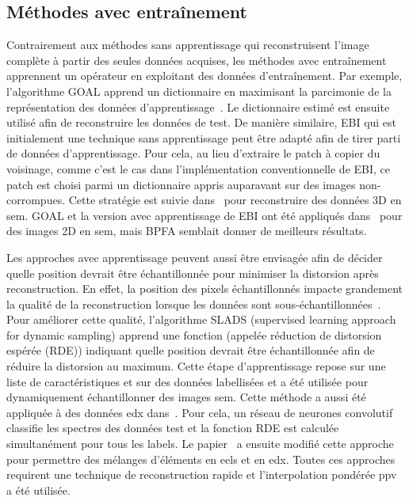 \subsection{Méthodes avec entraînement}

Contrairement aux méthodes sans apprentissage qui reconstruisent l'image complète à partir des seules données acquises, les méthodes avec entraînement apprennent un opérateur en exploitant des données d'entraînement. Par exemple, l'algorithme GOAL apprend un dictionnaire en maximisant la parcimonie de la représentation des données d'apprentissage~\cite{hawe2013analysis}. Le dictionnaire estimé est ensuite utilisé afin de reconstruire les données de test. De manière similaire, EBI qui est initialement une technique sans apprentissage peut être adapté afin de tirer parti de données d'apprentissage. Pour cela, au lieu d'extraire le patch à copier du voisinage, comme c'est le cas dans l'implémentation conventionnelle de EBI, ce patch est choisi parmi un dictionnaire appris auparavant sur des images non-corrompues. Cette stratégie est suivie dans~\cite{trampert2018exemplar} pour reconstruire des données 3D en \gls{sem}. GOAL et la version avec apprentissage de EBI ont été appliqués dans~\cite{trampert2018ultramicroscopy} pour des images 2D en \gls{sem}, mais BPFA semblait donner de meilleurs résultats.

Les approches avec apprentissage peuvent aussi être envisagée afin de décider quelle position devrait être échantillonnée pour minimiser la distorsion après reconstruction. En effet, la position des pixels échantillonnés impacte grandement la qualité de la reconstruction lorsque les données sont sous-échantillonnées~\cite{trampert2018ultramicroscopy}. Pour améliorer cette qualité, l'algorithme SLADS (supervised learning approach for dynamic sampling) apprend une fonction (appelée réduction de distorsion espérée (RDE)) indiquant quelle position devrait être échantillonnée afin de réduire la distorsion au maximum\cite{godaliyadda2018tci}. Cette étape d'apprentissage repose sur une liste de caractéristiques et sur des données labellisées et a été utilisée pour dynamiquement échantillonner des images \gls{sem}.
%
Cette méthode a aussi été appliquée à des données \gls{edx} dans~\cite{zhang2018reduced}. Pour cela, un réseau de neurones convolutif classifie les spectres des données test et la fonction RDE est calculée simultanément pour tous les labels. %
%
Le papier~\cite{hujsak2018high} a ensuite modifié cette approche pour permettre des mélanges d'éléments en \gls{eels} et en \gls{edx}. Toutes ces approches requirent une technique de reconstruction rapide et l'interpolation pondérée \gls{ppv} a été utilisée.



